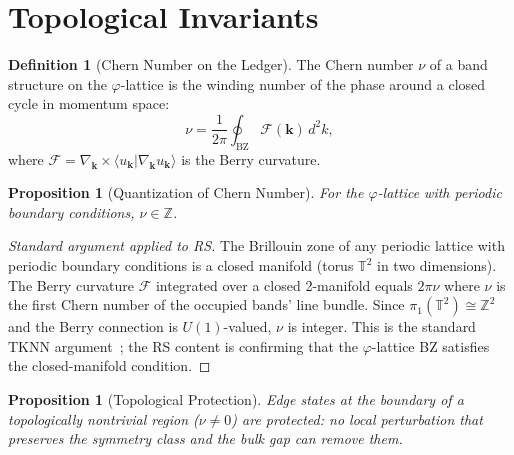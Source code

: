 \documentclass[12pt,a4paper]{article}
\newtheorem{proposition}[theorem]{Proposition}
\theoremstyle{definition}
\newtheorem{definition}[theorem]{Definition}
\theoremstyle{remark}
\begin{document}
\section{Topological Invariants}
\label{sec:invariants}

\begin{definition}[Chern Number on the Ledger]
The Chern number $\nu$ of a band structure on the
$\varphi$-lattice is the winding number of the phase around a
closed cycle in momentum space:
\begin{equation}
  \nu = \frac{1}{2\pi} \oint_{\mathrm{BZ}}
  \mathcal{F}(\mathbf{k})\,d^2k,
\end{equation}
where $\mathcal{F} = \nabla_{\mathbf{k}} \times
\langle u_{\mathbf{k}} | \nabla_{\mathbf{k}} u_{\mathbf{k}}
\rangle$ is the Berry curvature.
\end{definition}

\begin{proposition}[Quantization of Chern Number]
\label{prop:chern-int}
For the $\varphi$-lattice with periodic boundary conditions, $\nu \in \mathbb{Z}$.
\end{proposition}

\begin{proof}[Standard argument applied to RS]
The Brillouin zone of any periodic lattice with periodic boundary
conditions is a closed manifold (torus $\mathbb{T}^2$ in two dimensions).
The Berry curvature $\mathcal{F}$ integrated over a closed 2-manifold
equals $2\pi\nu$ where $\nu$ is the first Chern number of the occupied
bands' line bundle.  Since $\pi_1(\mathbb{T}^2) \cong \mathbb{Z}^2$
and the Berry connection is $U(1)$-valued, $\nu$ is integer.  This is
the standard TKNN argument~\cite{Thouless1982}; the RS content is
confirming that the $\varphi$-lattice BZ satisfies the closed-manifold
condition.
\end{proof}

\begin{proposition}[Topological Protection]
\label{thm:protection}
Edge states at the boundary of a topologically nontrivial region
($\nu \neq 0$) are protected: no local perturbation that preserves
the symmetry class and the bulk gap can remove them.
\end{proposition}
\end{document}
